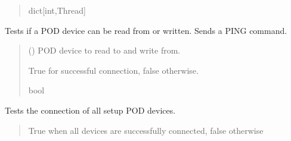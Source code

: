 \documentclass[letterpaper,10pt,english]{sphinxmanual}
\begin{document}
\begin{fulllineitems}
\begin{fulllineitems}
\begin{quote}
\begin{description}
\sphinxAtStartPar
dict{[}int,Thread{]}

\end{description}\end{quote}

\end{fulllineitems}


\begin{fulllineitems}
\label{\detokenize{Setup_PodInterface:Setup_PodInterface.Setup_Interface._TestDeviceConnection}}
\pysigstartsignatures
{}
\pysigstopsignatures
\sphinxAtStartPar
Tests if a POD device can be read from or written. Sends a PING command.
\begin{quote}\begin{description}
\sphinxAtStartPar
{} ({\hyperref[\detokenize{BasicPodProtocol:BasicPodProtocol.POD_Basics}]{}}) \textendash{} POD device to read to and write from.

\sphinxAtStartPar
True for successful connection, false otherwise.

\sphinxAtStartPar
bool

\end{description}\end{quote}

\end{fulllineitems}


\begin{fulllineitems}
\label{\detokenize{Setup_PodInterface:Setup_PodInterface.Setup_Interface._TestDeviceConnection_All}}
\pysigstartsignatures
{}
\pysigstopsignatures
\sphinxAtStartPar
Tests the connection of all setup POD devices.
\begin{quote}\begin{description}
\sphinxAtStartPar
True when all devices are successfully connected, false otherwise


\end{description}
\end{quote}
\end{fulllineitems}
\end{fulllineitems}
\end{document}
